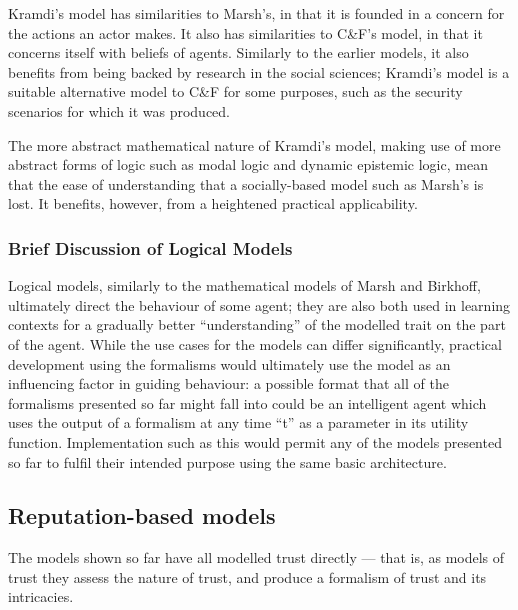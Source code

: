 \documentclass[11pt,english,twocolumn]{article}
\begin{document}
Kramdi's model has similarities to Marsh's, in that it is founded in a concern for the actions an actor makes. It also has similarities to C\&F's model, in that it concerns itself with beliefs of agents. Similarly to the earlier models, it also benefits from being backed by research in the social sciences; Kramdi's model is a suitable alternative model to C\&F for some purposes, such as the security scenarios for which it was produced.\par

The more abstract mathematical nature of Kramdi's model, making use of more abstract forms of logic such as modal logic and dynamic epistemic logic, mean that the ease of understanding that a socially-based model such as Marsh's is lost. It benefits, however, from a heightened practical applicability.\par

\subsubsection{Brief Discussion of Logical Models}

Logical models, similarly to the mathematical models of Marsh and Birkhoff, ultimately direct the behaviour of some agent; they are also both used in learning contexts for a gradually better ``understanding'' of the modelled trait on the part of the agent. While the use cases for the models can differ significantly, practical development using the formalisms would ultimately use the model as an influencing factor in guiding behaviour: a possible format that all of the formalisms presented so far might fall into could be an intelligent agent which uses the output of a formalism at any time ``t'' as a parameter in its utility function. Implementation such as this would permit any of the models presented so far to fulfil their intended purpose using the same basic architecture.\par


\subsection{Reputation-based models}
The models shown so far have all modelled trust directly --- that is, as models of trust they assess the nature of trust, and produce a formalism of trust and its intricacies.\par
\end{document}
